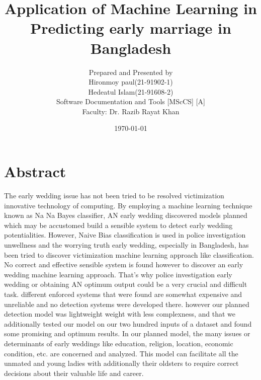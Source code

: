 \documentclass{article}
\title{Application of Machine Learning in Predicting early marriage in Bangladesh}
\author{Prepared and Presented by \\
Hironmoy paul(21-91902-1) \\ Hedeatul Islam(21-91608-2)\\ Software Documentation and Tools [MScCS] [A]\\ Faculty: Dr. Razib Rayat Khan }
\date{\today}
\begin{document}
\maketitle

\section*{Abstract}
   The early wedding issue has not been tried to be resolved victimization innovative technology of computing. By employing a machine learning technique known as Na Na Bayes classifier, AN early wedding discovered models planned which may be accustomed build a sensible system to detect early wedding potentialities. However, Naive Bias classification is used in police investigation unwellness and the worrying truth early wedding, especially in Bangladesh, has been tried to discover victimization machine learning approach like classification. No correct and effective sensible system is found however to discover an early wedding machine learning approach. That’s why police investigation early wedding or obtaining AN optimum output could be a very crucial and difficult task. different enforced systems that were found are somewhat expensive and unreliable and no detection systems were developed there. however our planned detection model was lightweight weight with less complexness, and that we additionally tested our model on our two hundred inputs of a dataset and found some promising and optimum results. In our planned model, the many issues or determinants of early weddings like education, religion, location, economic condition, etc. are concerned and analyzed. This model can facilitate all the unmated and young ladies with additionally their oldsters to require correct decisions about their valuable life and career.
\end{document}
